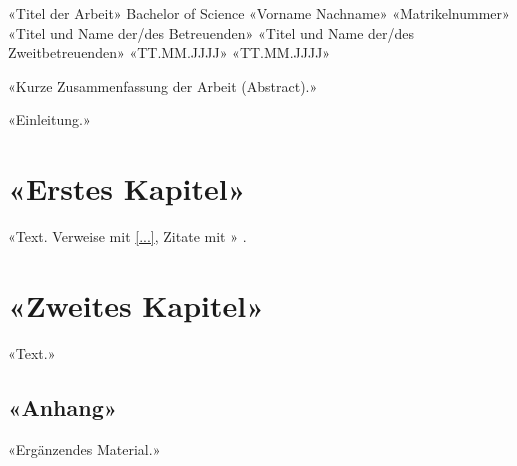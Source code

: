 \documentclass[hyperref, nat]{fgdh-thesis}
\begin{document}
\bachelortitlepage
  {«Titel der Arbeit»}
  {Bachelor of Science}
  {«Vorname Nachname»}
  {«Matrikelnummer»}
  {«Titel und Name der/des Betreuenden»}
  {«Titel und Name der/des Zweitbetreuenden»}
  {«TT.MM.JJJJ»}
  {«TT.MM.JJJJ»}

\begin{preface}
  \abstract
  «Kurze Zusammenfassung der Arbeit (Abstract).»

  \tableofcontents
\end{preface}

\introduction
«Einleitung.»

\section{«Erstes Kapitel»}
\label{sec:erstes-kapitel}
«Text. Verweise mit \ref{...}, Zitate mit \cite{schlüssel}» \cite{beispiel2025}.


\section{«Zweites Kapitel»}
\label{sec:zweites-kapitel}
«Text.»

\begin{appendix}
  \listoffigures
  \listoftables

  \listofabbreviations

  
  

  \begin{appendices}
    \section{«Anhang»}
    «Ergänzendes Material.»
  \end{appendices}

  \declaration

  \aideclaration
\end{appendix}
\end{document}
